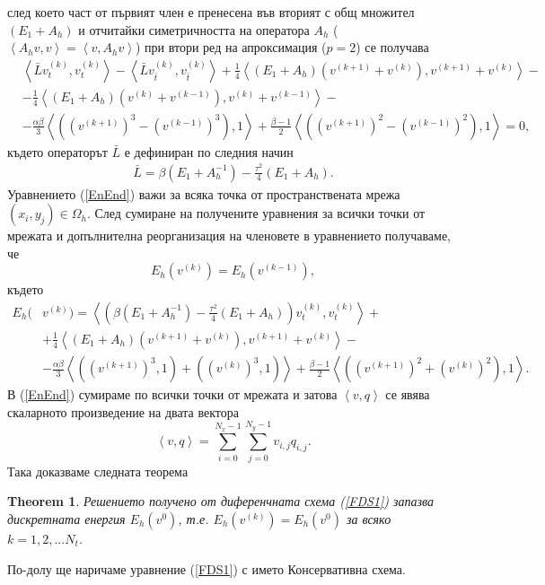 \documentclass{article}
\newcommand{\be}{\begin{equation}}
\newcommand{\ee}{\end{equation}}
\newcommand{\rf}[1]{(\ref{#1})}
\newtheorem{thm}{Theorem}
\theoremstyle{remark}
\begin{document}
след което част от първият член е пренесена във вторият с общ множител $(E_1 + A_h )$ и отчитайки симетричността на оператора $A_h$ ($\left< A_h v,v\right> = \left< v, A_h v\right>$) при втори ред на апроксимация ($p=2$) се получава
\begin{align}\label{EnEnd}
&\left< \bar L  v_{t}^{(k)}, v_{t}^{(k)} \right> - \left< \bar L v_{\bar t}^{(k)}, v_{\bar t}^{(k)} \right>  
 +\frac{1}{4} \left<  (E_1 +A_h ) \left( v^{(k+1)} + v^{(k)} \right ) , v^{(k+1)} + v^{(k)} \right>  -\nonumber \\
&- \frac{1}{4} \left<  (E_1 +A_h ) \left( v^{(k)} + v^{(k-1)} \right ) , v^{(k)} + v^{(k-1)} \right> - \nonumber \\
&- \frac{\alpha \beta}{3} \left< \left( (v^{(k+1)})^3-(v^{(k-1)})^3 \right), 1 \right> + \frac{\beta - 1}{2} \left< \left( (v^{(k+1)})^2-(v^{(k-1)})^2 \right), 1 \right> =0,
\end{align}
където операторът $\bar L$ е дефиниран по следния начин
\begin{align}
\bar L = \beta (E_1+A_h^{-1})- \frac{\tau^2}{4}( E_1+A_h ).
\end{align}
Уравнението \rf{EnEnd} важи за всяка точка от пространствената мрежа $(x_i,y_j) \in \Omega_h$. След сумиране на получените уравнения за всички точки от мрежата и допълнителна реорганизация на членовете в уравнението получаваме, че
\be \label{num_en}
E_h(v^{(k)}) =E_h(v^{(k-1)}),
\ee
където
\begin{align}\label{en_norm}
E_h(&v^{(k)})=\left< \left( \beta (E_1+A_h^{-1})- \frac{\tau^2}{4}( E_1+A_h ) \right)v_{t}^{(k)} ,v_{t}^{(k)} \right>+ \nonumber\\
&+\frac{1}{4}  \left<  ( E_1+A_h)(v^{(k+1)}+v^{(k)}), v^{(k+1)}+v^{(k)} \right> - \nonumber\\
&- \frac{\alpha \beta}{3} \left< ((v^{(k+1)})^3,1)+((v^{(k)})^3,1) \right> + \frac{\beta - 1}{2} \left< \left( (v^{(k+1)})^2+(v^{(k)})^2 \right), 1 \right>.
\end{align}
В \rf{EnEnd} сумираме по всички точки от мрежата и затова  $\left< v, q \right>$ се явява скаларното произведение на двата вектора 
\be\label{dotProd}
\left<v, q \right> = \sum_{i=0}^{N_x-1} \sum_{j=0}^{N_y-1} v_{i,j} q_{i,j}.
\ee
Така доказваме следната теорема
\begin{thm}
Решението получено от диференчната схема \rf{FDS1} запазва дискретната енергия $E_h(v^0)$, т.е.  $E_h(v^{(k)}) =E_h(v^{0})$ за всяко $k=1,2,...N_t$.
\end{thm}
По-долу ще наричаме уравнение \rf{FDS1} с името Консервативна схема.
\end{document}
